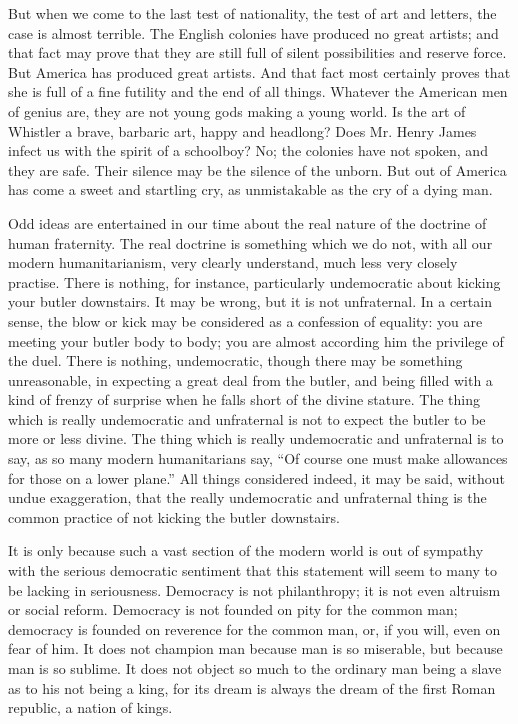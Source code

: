 But when we come to the last test of nationality, the test of art and letters, the case is almost terrible. The English colonies have produced no great artists; and that fact may prove that they are still full of silent possibilities and reserve force. But America has produced great artists. And that fact most certainly proves that she is full of a fine futility and the end of all things. Whatever the American men of genius are, they are not young gods making a young world. Is the art of Whistler a brave, barbaric art, happy and headlong? Does Mr. Henry James infect us with the spirit of a schoolboy? No; the colonies have not spoken, and they are safe. Their silence may be the silence of the unborn. But out of America has come a sweet and startling cry, as unmistakable as the cry of a dying man.


Odd ideas are entertained in our time about the real nature of the doctrine of human fraternity. The real doctrine is something which we do not, with all our modern humanitarianism, very clearly understand, much less very closely practise. There is nothing, for instance, particularly undemocratic about kicking your butler downstairs. It may be wrong, but it is not unfraternal. In a certain sense, the blow or kick may be considered as a confession of equality: you are meeting your butler body to body; you are almost according him the privilege of the duel. There is nothing, undemocratic, though there may be something unreasonable, in expecting a great deal from the butler, and being filled with a kind of frenzy of surprise when he falls short of the divine stature. The thing which is really undemocratic and unfraternal is not to expect the butler to be more or less divine. The thing which is really undemocratic and unfraternal is to say, as so many modern humanitarians say, “Of course one must make allowances for those on a lower plane.” All things considered indeed, it may be said, without undue exaggeration, that the really undemocratic and unfraternal thing is the common practice of not kicking the butler downstairs.

It is only because such a vast section of the modern world is out of sympathy with the serious democratic sentiment that this statement will seem to many to be lacking in seriousness. Democracy is not philanthropy; it is not even altruism or social reform. Democracy is not founded on pity for the common man; democracy is founded on reverence for the common man, or, if you will, even on fear of him. It does not champion man because man is so miserable, but because man is so sublime. It does not object so much to the ordinary man being a slave as to his not being a king, for its dream is always the dream of the first Roman republic, a nation of kings.

